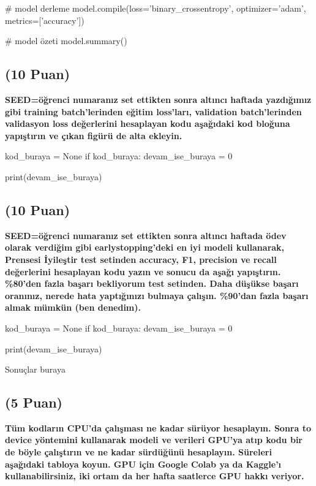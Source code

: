 \documentclass[11pt]{article}
\begin{document}
\begin{itemize}
\begin{itemize}
\begin{python}
# model derleme
model.compile(loss='binary_crossentropy', optimizer='adam', metrics=['accuracy'])

# model özeti
model.summary()
\end{python}

\subsection{(10 Puan)} \textbf{SEED=öğrenci numaranız set ettikten sonra altıncı haftada yazdığımız gibi training batch'lerinden eğitim loss'ları, validation batch'lerinden validasyon loss değerlerini hesaplayan kodu aşağıdaki kod bloğuna yapıştırın ve çıkan figürü de alta ekleyin.}

\begin{python}
kod_buraya = None
if kod_buraya:
    devam_ise_buraya = 0

print(devam_ise_buraya)
\end{python}

\begin{comment}
\begin{figure}[ht!]
    \centering
    \texttt{[image: mypicturehere.png]}
    \caption{Buraya açıklama yazın}
    \label{fig:my_pic}
\end{figure}
\end{comment}

\subsection{(10 Puan)} \textbf{SEED=öğrenci numaranız set ettikten sonra altıncı haftada ödev olarak verdiğim gibi earlystopping'deki en iyi modeli kullanarak, Prensesi İyileştir test setinden accuracy, F1, precision ve recall değerlerini hesaplayan kodu yazın ve sonucu da aşağı yapıştırın. \%80'den fazla başarı bekliyorum test setinden. Daha düşükse başarı oranınız, nerede hata yaptığınızı bulmaya çalışın. \%90'dan fazla başarı almak mümkün (ben denedim).}

\begin{python}
kod_buraya = None
if kod_buraya:
    devam_ise_buraya = 0

print(devam_ise_buraya)
\end{python}

Sonuçlar buraya

\subsection{(5 Puan)} \textbf{Tüm kodların CPU'da çalışması ne kadar sürüyor hesaplayın. Sonra to device yöntemini kullanarak modeli ve verileri GPU'ya atıp kodu bir de böyle çalıştırın ve ne kadar sürdüğünü hesaplayın. Süreleri aşağıdaki tabloya koyun. GPU için Google Colab ya da Kaggle'ı kullanabilirsiniz, iki ortam da her hafta saatlerce GPU hakkı veriyor.}


\end{itemize}
\end{itemize}
\end{document}
